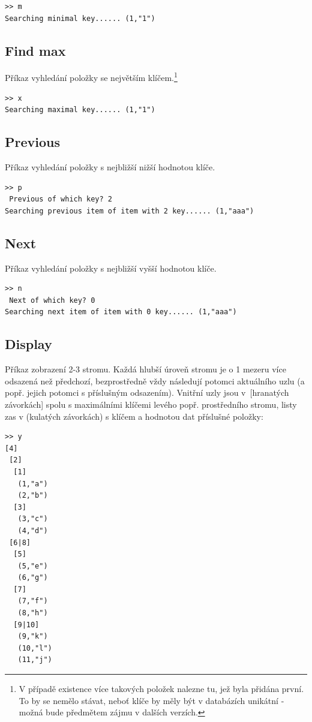 \documentclass[11pt,a4paper]{article}
\begin{document}
\begin{verbatim}
>> m
Searching minimal key...... (1,"1")
\end{verbatim}

\subsection{Find max}
Příkaz vyhledání položky se největším klíčem.\footnote{V případě existence více
takových položek nalezne tu, jež byla přidána první. To by se nemělo stávat,
neboť klíče by měly být v databázích unikátní - možná bude předmětem zájmu v
dalších verzích.}

\begin{verbatim}
>> x
Searching maximal key...... (1,"1")
\end{verbatim}

\subsection{Previous}
Příkaz vyhledání položky s nejbližší nižší hodnotou klíče.

\begin{verbatim}
>> p
 Previous of which key? 2
Searching previous item of item with 2 key...... (1,"aaa")
\end{verbatim}

\subsection{Next}
Příkaz vyhledání položky s nejbližší vyšší hodnotou klíče.

\begin{verbatim}
>> n
 Next of which key? 0
Searching next item of item with 0 key...... (1,"aaa")
\end{verbatim}

\subsection{Display}
Příkaz zobrazení 2-3 stromu.
Každá hlubší úroveň stromu je o 1 mezeru více odsazená než předchozí,
bezprostředně vždy následují potomci aktuálního uzlu (a popř. jejich potomci s
příslušným odsazením).
Vnitřní uzly jsou v~[hranatých závorkách] spolu s maximálními klíčemi levého
popř. prostřední\-ho stromu, listy zas v (kulatých závorkách) s klíčem a hodnotou
dat příslušné položky:

\begin{verbatim}
>> y
[4]
 [2]
  [1]
   (1,"a")
   (2,"b")
  [3]
   (3,"c")
   (4,"d")
 [6|8]
  [5]
   (5,"e")
   (6,"g")
  [7]
   (7,"f")
   (8,"h")
  [9|10]
   (9,"k")
   (10,"l")
   (11,"j")
\end{verbatim}
\end{document}
